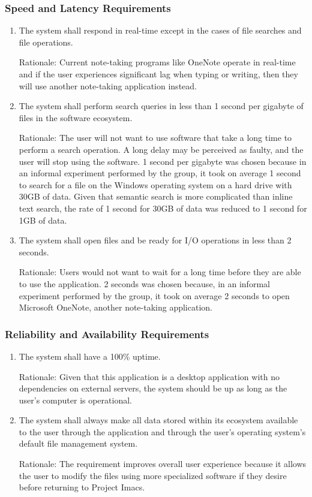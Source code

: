 \documentclass{article}
\begin{document}
\subsubsection{Speed and Latency Requirements}
\begin{enumerate}[SLR1]
\item The system shall respond in real-time except in the cases of file searches and file operations.

Rationale: Current note-taking programs like OneNote operate in real-time and if the user experiences significant lag when typing or writing, then they will use another note-taking application instead.
\item The system shall perform search queries in less than 1 second per gigabyte of files in the software ecosystem.

Rationale: The user will not want to use software that take a long time to perform a search operation. A long delay may be perceived as faulty, and the user will stop using the software. 1 second per gigabyte was chosen because in an informal experiment performed by the group, it took on average 1 second to search for a file on the Windows operating system on a hard drive with 30GB of data. Given that semantic search is more complicated than inline text search, the rate of 1 second for 30GB of data was reduced to 1 second for 1GB of data.

\item The system shall open files and be ready for I/O operations in less than 2 seconds.

Rationale: Users would not want to wait for a long time before they are able to use the application. 2 seconds was chosen because, in an informal experiment performed by the group, it took on average 2 seconds to open Microsoft OneNote, another note-taking application.
\end{enumerate}

\subsubsection{Reliability and Availability Requirements}
\begin{enumerate}[R{A}R1]
\item The system shall have a 100\% uptime.

Rationale: Given that this application is a desktop application with no dependencies on external servers, the system should be up as long as the user's computer is operational.

\newpage
\item The system shall always make all data stored within its ecosystem available to the user through the application and through the user's operating system's default file management system.

Rationale: The requirement improves overall user experience because it allows the user to modify the files using more specialized software if they desire before returning to Project Imacs.
\end{enumerate}
\end{document}
